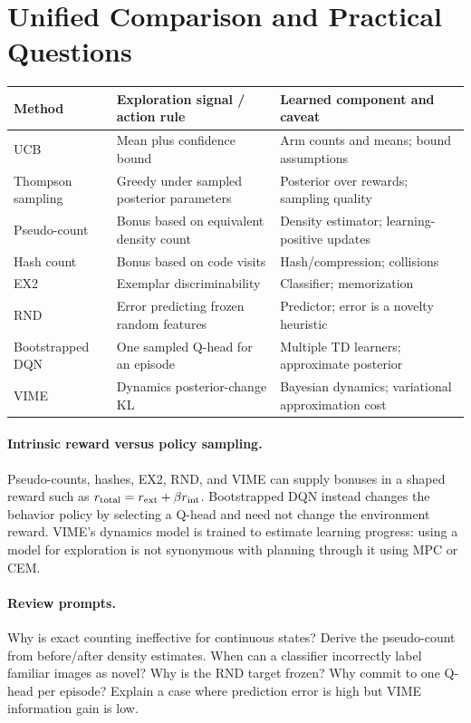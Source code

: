 \section{Unified Comparison and Practical Questions}
\begin{center}\small
\begin{tabularx}{\textwidth}{@{}p{}X X@{}}\toprule
Method & Exploration signal / action rule & Learned component and caveat\\\midrule
UCB & Mean plus confidence bound & Arm counts and means; bound assumptions\\
Thompson sampling & Greedy under sampled posterior parameters & Posterior over rewards; sampling quality\\
Pseudo-count & Bonus based on equivalent density count & Density estimator; learning-positive updates\\
Hash count & Bonus based on code visits & Hash/compression; collisions\\
EX2 & Exemplar discriminability & Classifier; memorization\\
RND & Error predicting frozen random features & Predictor; error is a novelty heuristic\\
Bootstrapped DQN & One sampled Q-head for an episode & Multiple TD learners; approximate posterior\\
VIME & Dynamics posterior-change KL & Bayesian dynamics; variational approximation cost\\\bottomrule
\end{tabularx}
\end{center}

\paragraph{Intrinsic reward versus policy sampling.}
Pseudo-counts, hashes, EX2, RND, and VIME can supply bonuses in a shaped reward such as $r_{\rm total}=r_{\rm ext}+\beta r_{\rm int}$. Bootstrapped DQN instead changes the behavior policy by selecting a Q-head and need not change the environment reward. VIME's dynamics model is trained to estimate learning progress: using a model for exploration is not synonymous with planning through it using MPC or CEM.

\paragraph{Review prompts.}
Why is exact counting ineffective for continuous states? Derive the pseudo-count from before/after density estimates. When can a classifier incorrectly label familiar images as novel? Why is the RND target frozen? Why commit to one Q-head per episode? Explain a case where prediction error is high but VIME information gain is low.

